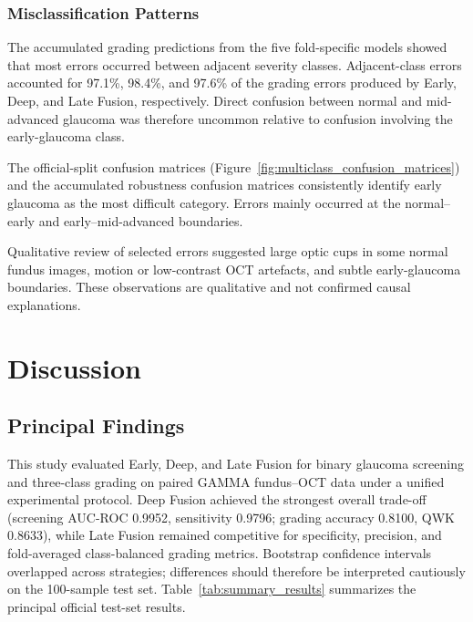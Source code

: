 \documentclass{ieeeaccess}
\begin{document}
\subsubsection{Misclassification Patterns}
\label{subsubsec:misclassification_results}

The accumulated grading predictions from the five fold-specific models showed that most errors occurred between adjacent severity classes. Adjacent-class errors accounted for 97.1\%, 98.4\%, and 97.6\% of the grading errors produced by Early, Deep, and Late Fusion, respectively. Direct confusion between normal and mid-advanced glaucoma was therefore uncommon relative to confusion involving the early-glaucoma class.

The official-split confusion matrices (Figure~\ref{fig:multiclass_confusion_matrices}) and the accumulated robustness confusion matrices consistently identify early glaucoma as the most difficult category. Errors mainly occurred at the normal--early and early--mid-advanced boundaries.

Qualitative review of selected errors suggested large optic cups in some normal fundus images, motion or low-contrast OCT artefacts, and subtle early-glaucoma boundaries. These observations are qualitative and not confirmed causal explanations.
\section{Discussion}
\label{sec:discussion}

\subsection{Principal Findings}
\label{subsec:principal_findings}

This study evaluated Early, Deep, and Late Fusion for binary glaucoma screening and three-class grading on paired GAMMA fundus--OCT data under a unified experimental protocol. Deep Fusion achieved the strongest overall trade-off (screening AUC-ROC 0.9952, sensitivity 0.9796; grading accuracy 0.8100, QWK 0.8633), while Late Fusion remained competitive for specificity, precision, and fold-averaged class-balanced grading metrics. Bootstrap confidence intervals overlapped across strategies; differences should therefore be interpreted cautiously on the 100-sample test set. Table~\ref{tab:summary_results} summarizes the principal official test-set results.
\end{document}
